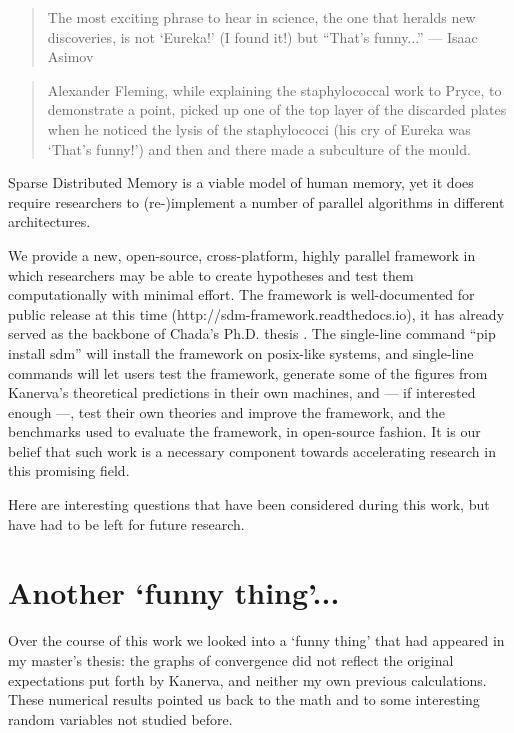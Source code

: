 \begin{flushright}{\slshape

    \begin{quote}
    The most exciting phrase to hear in science, the one that heralds new discoveries, is not `Eureka!' (I found it!) but ``That's funny...''
    — Isaac Asimov
    \end{quote}

    \bigskip
\begin{quote}
Alexander Fleming, while explaining the staphylococcal work to Pryce, to demonstrate a point, picked up one of the top layer of the discarded plates when he noticed the lysis of the staphylococci (his cry of Eureka was ‘That’s funny!’) and then and there made a subculture of the mould.
\end{quote}

\bigskip
\bigskip

}
\end{flushright}


Sparse Distributed Memory is a viable model of human memory, yet it does require researchers to (re-)implement a number of parallel algorithms in different architectures.

We provide a new, open-source, cross-platform, highly parallel framework in which researchers may be able to create hypotheses and test them computationally with minimal effort. The framework is well-documented for public release at this time (http://sdm-framework.readthedocs.io), it has already served as the backbone of Chada's Ph.D. thesis \citep{chada2016you}. The single-line command ``pip install sdm'' will install the framework on posix-like systems, and single-line commands will let users test the framework, generate some of the figures from Kanerva's theoretical predictions in their own machines, and --- if interested enough ---, test their own theories and improve the framework, and the benchmarks used to evaluate the framework, in open-source fashion. It is our belief that such work is a necessary component towards accelerating research in this promising field.

Here are interesting questions that have been considered during this work, but have had to be left for future research.


\section{Another `funny thing'...}

Over the course of this work we looked into a `funny thing' that had appeared in my master's thesis:  the graphs of convergence did not reflect the original expectations put forth by Kanerva, and neither my own previous calculations.  These numerical results pointed us back to the math and to some interesting random variables not studied before.


